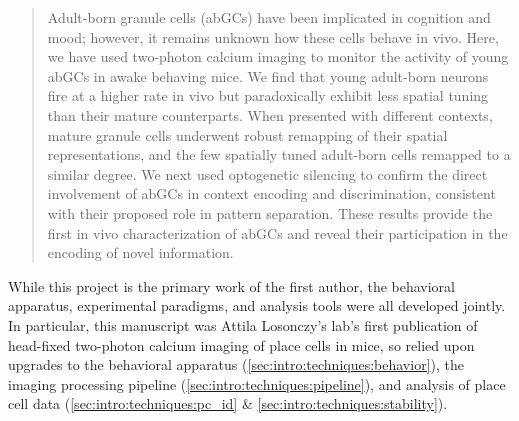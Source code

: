 \begin{quote}
Adult-born granule cells (abGCs) have been implicated in cognition and mood; however, it remains unknown how these cells behave in vivo. Here, we have used two-photon calcium imaging to monitor the activity of young abGCs in awake behaving mice. We find that young adult-born neurons fire at a higher rate in vivo but paradoxically exhibit less spatial tuning than their mature counterparts. When presented with different contexts, mature granule cells underwent robust remapping of their spatial representations, and the few spatially tuned adult-born cells remapped to a similar degree. We next used optogenetic silencing to confirm the direct involvement of abGCs in context encoding and discrimination, consistent with their proposed role in pattern separation. These results provide the first in vivo characterization of abGCs and reveal their participation in the encoding of novel information.
\end{quote}

While this project is the primary work of the first author, the behavioral apparatus, experimental paradigms, and analysis tools were all developed jointly.
In particular, this manuscript was Attila Losonczy's lab's first publication of head-fixed two-photon calcium imaging of place cells in mice, so relied upon upgrades to the behavioral apparatus (\autoref{sec:intro:techniques:behavior}), the imaging processing pipeline (\autoref{sec:intro:techniques:pipeline}), and analysis of place cell data (\autoref{sec:intro:techniques:pc_id} \& \autoref{sec:intro:techniques:stability}).

